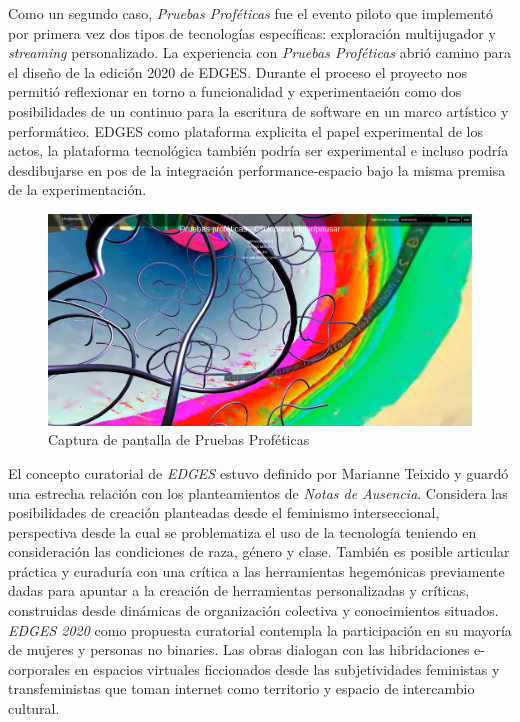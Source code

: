 Como un segundo caso, \textit{Pruebas Proféticas} fue el evento piloto que implementó por primera vez dos tipos de tecnologías específicas: exploración multijugador y \textit{streaming} personalizado. La experiencia con \textit{Pruebas Proféticas} abrió camino para el diseño de la edición 2020 de EDGES. Durante el proceso el proyecto nos permitió reflexionar en torno a funcionalidad y experimentación como dos posibilidades de un continuo para la escritura de software en un marco artístico y performático. EDGES como plataforma explicita el papel experimental de los actos, la plataforma tecnológica también podría ser experimental e incluso podría desdibujarse en pos de la integración performance-espacio bajo la misma premisa de la experimentación.


\begin{figure}
  \includegraphics[width=\textwidth]{img/pruebas.jpg}
  \caption{Captura de pantalla de Pruebas Proféticas}
\end{figure}

El concepto curatorial de \textit{EDGES} estuvo definido por Marianne Teixido y guardó una estrecha relación con los planteamientos de \textit{Notas de Ausencia}. Considera las posibilidades de creación planteadas desde el feminismo interseccional, perspectiva desde la cual se problematiza el uso de la tecnología teniendo en consideración las condiciones de raza, género y clase. También es posible articular práctica y curaduría con una crítica a las herramientas hegemónicas previamente dadas para apuntar a la creación de herramientas personalizadas y críticas, construidas desde dinámicas de organización colectiva y conocimientos situados. \textit{EDGES 2020} como propuesta curatorial contempla la participación en su mayoría de mujeres y personas no binaries. Las obras dialogan con las hibridaciones e-corporales en espacios virtuales ficcionados desde las subjetividades feministas y transfeministas que toman internet como territorio y espacio de intercambio cultural.

